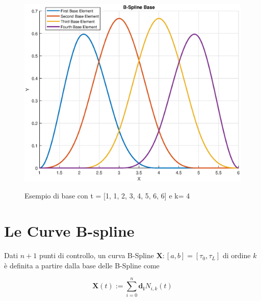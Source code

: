 \documentclass[a4paper, 12pt]{article}
\begin{document}
\begin{figure}[h]
	\centering
	\caption{Esempio di base con t = [1, 1, 2, 3, 4, 5, 6, 6] e k= 4}
	\includegraphics[scale=0.7]{b-spline_base_plot.eps}
	\label{fig:BSplineinBaseExample}
\end{figure}

\section{Le Curve B-spline}
Dati $n+1$ punti di controllo, un curva B-Spline $\mathbf{X} : [a,b] = [\tau_0, \tau_L]$ di ordine $k$ è definita a partire dalla base delle B-Spline come

$$\mathbf{X}(t) := \sum_{i=0}^{n} \mathbf{d_i} N_{i, k}(t)$$
\end{document}
